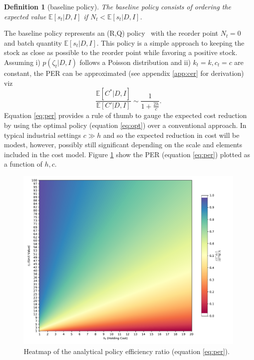 \documentclass[a4paper,12pt]{article}
\newtheorem{definition}{Definition}
\begin{document}
	\begin{definition}[baseline policy]
		The baseline policy consists of ordering the expected value $\mathbb{E}[s_t|D,I]$ if $N_t<\mathbb{E}[s_t|D,I]$.
	\end{definition}
	
	The baseline policy represents an (R,Q) policy~\citep{bartmann1992inventory,axsaeter2006inventory} with the reorder point $N_t=0$ and batch quantity $\mathbb{E}[s_t|D,I]$. This policy is a simple approach to keeping the stock as close as possible to the reorder point while favoring a positive stock. Assuming i) $p(\zeta_t|D,I)$ follows a Poisson distribution and ii) $k_t=k,c_t=c$ are constant, the PER can be approximated (see appendix \ref{app:cer} for derivation) viz
	\begin{equation}
		\frac{\mathbb{E}[C^*|D,I] }{\mathbb{E}[C'|D,I]}\sim \frac{1}{1+\frac{2h}{c}}.
		\label{eq:per}
	\end{equation}
	Equation \eqref{eq:per} provides a rule of thumb to gauge the expected cost reduction by using the optimal policy (equation \eqref{eq:opt}) over a conventional approach. In typical industrial settings $c\gg h$ and so the expected reduction in cost will be modest, however, possibly still significant depending on the scale and elements included in the cost model. Figure \ref{fig:heatmap_analytical} show the PER (equation \eqref{eq:per}) plotted as a function of $h,c$.
	\begin{figure}[h!]
		\centering
		\includegraphics[width=\textwidth]{figures/analytical_heatmap.pdf}
		\caption{Heatmap of the analytical policy efficiency ratio (equation \eqref{eq:per}).}
		\label{fig:heatmap_analytical}
	\end{figure}
	
\end{document}
